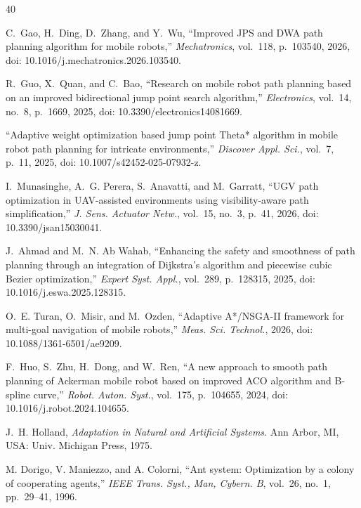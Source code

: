 \documentclass[lettersize,journal]{IEEEtran}
\begin{document}
\begin{thebibliography}{40}

C.~Gao, H.~Ding, D.~Zhang, and Y.~Wu, ``Improved JPS and DWA path planning algorithm for mobile robots,'' \textit{Mechatronics}, vol.~118, p.~103540, 2026, doi: 10.1016/j.mechatronics.2026.103540.



R.~Guo, X.~Quan, and C.~Bao, ``Research on mobile robot path planning based on an improved bidirectional jump point search algorithm,'' \textit{Electronics}, vol.~14, no.~8, p.~1669, 2025, doi: 10.3390/electronics14081669.



``Adaptive weight optimization based jump point Theta* algorithm in mobile robot path planning for intricate environments,'' \textit{Discover Appl. Sci.}, vol.~7, p.~11, 2025, doi: 10.1007/s42452-025-07932-z.



I.~Munasinghe, A.~G. Perera, S.~Anavatti, and M.~Garratt, ``UGV path optimization in UAV-assisted environments using visibility-aware path simplification,'' \textit{J. Sens. Actuator Netw.}, vol.~15, no.~3, p.~41, 2026, doi: 10.3390/jsan15030041.



J.~Ahmad and M.~N. Ab Wahab, ``Enhancing the safety and smoothness of path planning through an integration of Dijkstra's algorithm and piecewise cubic Bezier optimization,'' \textit{Expert Syst. Appl.}, vol.~289, p.~128315, 2025, doi: 10.1016/j.eswa.2025.128315.



O.~E. Turan, O.~Misir, and M.~Ozden, ``Adaptive A*/NSGA-II framework for multi-goal navigation of mobile robots,'' \textit{Meas. Sci. Technol.}, 2026, doi: 10.1088/1361-6501/ae9209.



F.~Huo, S.~Zhu, H.~Dong, and W.~Ren, ``A new approach to smooth path planning of Ackerman mobile robot based on improved ACO algorithm and B-spline curve,'' \textit{Robot. Auton. Syst.}, vol.~175, p.~104655, 2024, doi: 10.1016/j.robot.2024.104655.



J.~H. Holland, \textit{Adaptation in Natural and Artificial Systems}. Ann Arbor, MI, USA: Univ. Michigan Press, 1975.



M. Dorigo, V. Maniezzo, and A. Colorni, ``Ant system: Optimization by a colony of cooperating agents,'' \textit{IEEE Trans. Syst., Man, Cybern. B}, vol.~26, no.~1, pp.~29--41, 1996.



\end{thebibliography}
\end{document}
